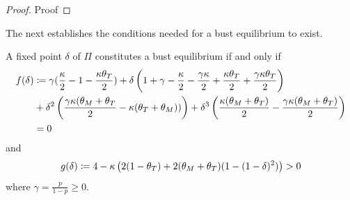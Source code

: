 \begin{proof}{Proof}









\end{proof}



The next establishes the conditions needed for a bust equilibrium to exist.  

\noindent \begin{lemma}\label{lem:bust-necessary} A fixed point $\delta$ of $\Pi$ constitutes a bust equilibrium if and only if
\begin{align*}
    f(\delta) &\coloneqq \gamma ( \frac{\kappa}{2}-1 - \frac{\kappa \theta_T}{2})  
    + \delta \left(1 + \gamma - \frac{\kappa}{2}  - \frac{\gamma \kappa}{2}  + \frac{\kappa \theta_T}{2}  + \frac{\gamma \kappa \theta_T}{2} \right)  \\
     &+ \delta^2 \left( \frac{\gamma \kappa (\theta_M + \theta_T}{2} - \kappa ( \theta_T + \theta_M))\right) + \delta^3 \left( \frac{\kappa (\theta_M + \theta_T)}{2} - \frac{\gamma \kappa (\theta_M + \theta_T)}{2}\right) \\
     &= 0
\end{align*}
and 
$$g(\delta) \coloneqq  4 - \kappa \left( 2 (1-\theta_T) + 2 (\theta_M + \theta_T) ( 1- (1-\delta)^2) \right) > 0 $$
where $\gamma = \frac{p}{1-p} \geq 0$.
\end{lemma}
